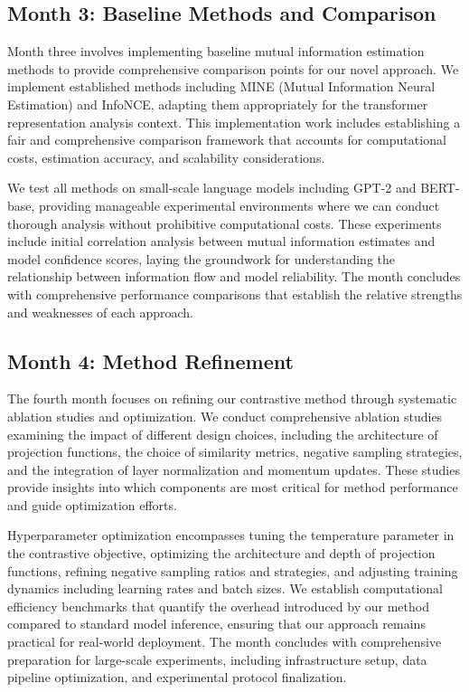 \documentclass[11pt, oneside]{book}
\theoremstyle{plain}
\theoremstyle{definition}
\theoremstyle{remark}
\begin{document}
\subsection{Month 3: Baseline Methods and Comparison}

Month three involves implementing baseline mutual information estimation methods to provide comprehensive comparison points for our novel approach. We implement established methods including MINE (Mutual Information Neural Estimation) and InfoNCE, adapting them appropriately for the transformer representation analysis context. This implementation work includes establishing a fair and comprehensive comparison framework that accounts for computational costs, estimation accuracy, and scalability considerations.

We test all methods on small-scale language models including GPT-2 and BERT-base, providing manageable experimental environments where we can conduct thorough analysis without prohibitive computational costs. These experiments include initial correlation analysis between mutual information estimates and model confidence scores, laying the groundwork for understanding the relationship between information flow and model reliability. The month concludes with comprehensive performance comparisons that establish the relative strengths and weaknesses of each approach.

\subsection{Month 4: Method Refinement}

The fourth month focuses on refining our contrastive method through systematic ablation studies and optimization. We conduct comprehensive ablation studies examining the impact of different design choices, including the architecture of projection functions, the choice of similarity metrics, negative sampling strategies, and the integration of layer normalization and momentum updates. These studies provide insights into which components are most critical for method performance and guide optimization efforts.

Hyperparameter optimization encompasses tuning the temperature parameter in the contrastive objective, optimizing the architecture and depth of projection functions, refining negative sampling ratios and strategies, and adjusting training dynamics including learning rates and batch sizes. We establish computational efficiency benchmarks that quantify the overhead introduced by our method compared to standard model inference, ensuring that our approach remains practical for real-world deployment. The month concludes with comprehensive preparation for large-scale experiments, including infrastructure setup, data pipeline optimization, and experimental protocol finalization.
\end{document}

